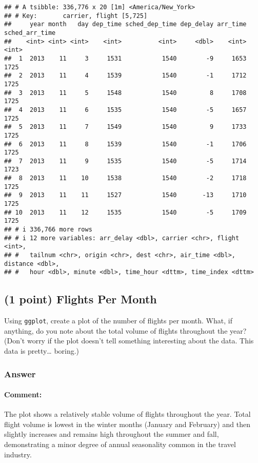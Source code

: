 \documentclass[
]{article}
\begin{document}
\begin{verbatim}
## # A tsibble: 336,776 x 20 [1m] <America/New_York>
## # Key:       carrier, flight [5,725]
##     year month   day dep_time sched_dep_time dep_delay arr_time sched_arr_time
##    <int> <int> <int>    <int>          <int>     <dbl>    <int>          <int>
##  1  2013    11     3     1531           1540        -9     1653           1725
##  2  2013    11     4     1539           1540        -1     1712           1725
##  3  2013    11     5     1548           1540         8     1708           1725
##  4  2013    11     6     1535           1540        -5     1657           1725
##  5  2013    11     7     1549           1540         9     1733           1725
##  6  2013    11     8     1539           1540        -1     1706           1725
##  7  2013    11     9     1535           1540        -5     1714           1723
##  8  2013    11    10     1538           1540        -2     1718           1725
##  9  2013    11    11     1527           1540       -13     1710           1725
## 10  2013    11    12     1535           1540        -5     1709           1725
## # i 336,766 more rows
## # i 12 more variables: arr_delay <dbl>, carrier <chr>, flight <int>,
## #   tailnum <chr>, origin <chr>, dest <chr>, air_time <dbl>, distance <dbl>,
## #   hour <dbl>, minute <dbl>, time_hour <dttm>, time_index <dttm>
\end{verbatim}

\newpage

\subsection{(1 point) Flights Per Month}\label{point-flights-per-month}

Using \texttt{ggplot}, create a plot of the number of flights per month.
What, if anything, do you note about the total volume of flights
throughout the year? (Don't worry if the plot doesn't tell something
interesting about the data. This data is pretty\ldots{} boring.)

\subsubsection{Answer}\label{answer-1}

\paragraph{Comment:}\label{comment}

The plot shows a relatively stable volume of flights throughout the
year. Total flight volume is lowest in the winter months (January and
February) and then slightly increases and remains high throughout the
summer and fall, demonstrating a minor degree of annual seasonality
common in the travel industry.
\end{document}
